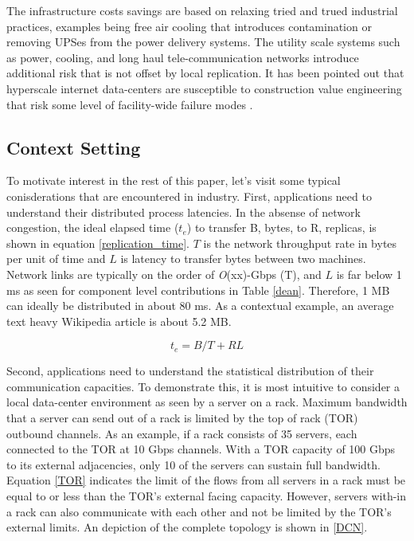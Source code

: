 \documentclass[conference]{IEEEtran}
\begin{document}
The infrastructure costs savings are based on relaxing tried and trued industrial practices, examples being free air cooling that introduces contamination or removing UPSes from the power delivery systems. The utility scale systems such as power, cooling, and long haul tele-communication networks introduce additional risk that is not offset by local replication. It has been pointed out that hyperscale internet data-centers are susceptible to construction value engineering that risk some level of facility-wide failure modes \cite{wsc}.

\subsection{Context Setting}

To motivate interest in the rest of this paper, let's visit some typical conisderations that are encountered in industry. First, applications need to understand their distributed process latencies. In the absense of network congestion, the ideal elapsed time ($t_e$) to transfer B, bytes, to R, replicas, is shown in equation \ref{replication_time}. $T$ is the network throughput rate in bytes per unit of time and $L$ is latency to transfer bytes between two machines\cite{GFS}. Network links are typically on the order of \textit{O}(xx)-Gbps (T), and $L$ is far below 1 ms as seen for component level contributions in Table \ref{dean}. Therefore, 1 MB can ideally be distributed in about 80 ms. As a contextual example, an average text heavy Wikipedia article is about 5.2 MB.

\begin{equation}
\label{replication_time}
t_e = B/T+RL
\end{equation}

Second, applications need to understand the statistical distribution of their communication capacities. To demonstrate this, it is most intuitive to consider a local data-center environment as seen by a server on a rack. Maximum bandwidth that a server can send out of a rack is limited by the top of rack (TOR) outbound channels. As an example, if a rack consists of 35 servers, each connected to the TOR at 10 Gbps channels. With a TOR capacity of 100 Gbps to its external adjacencies, only 10 of the servers can sustain full bandwidth.  Equation \ref{TOR} indicates the limit of the flows from all servers in a rack must be equal to or less than the TOR's external facing capacity. However, servers with-in a rack can also communicate with each other and not be limited by the TOR's external limits. An depiction of the complete topology is shown in \ref{DCN}.
\end{document}

